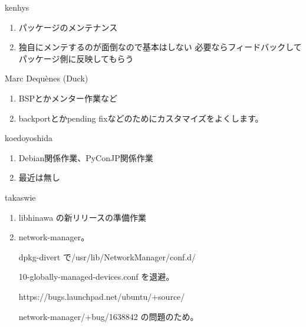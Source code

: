 \begin{prework}{ kenhys }
  \begin{enumerate}
  \item パッケージのメンテナンス
  \item 独自にメンテするのが面倒なので基本はしない 必要ならフィードバックしてパッケージ側に反映してもらう
  \end{enumerate}
\end{prework}

\begin{prework}{ Marc Dequènes (Duck) }
  \begin{enumerate}
  \item BSPとかメンター作業など
  \item backportとかpending fixなどのためにカスタマイズをよくします。
  \end{enumerate}
\end{prework}

\begin{prework}{ koedoyoshida }
  \begin{enumerate}
  \item Debian関係作業、PyConJP関係作業
  \item 最近は無し
  \end{enumerate}
\end{prework}

\begin{prework}{ takaswie }
  \begin{enumerate}
  \item libhinawa の新リリースの準備作業
  \item network-manager。

    dpkg-divert で/usr/lib/NetworkManager/conf.d/

    10-globally-managed-devices.conf を退避。

    https://bugs.launchpad.net/ubuntu/+source/

    network-manager/+bug/1638842 の問題のため。
  \end{enumerate}
\end{prework}

